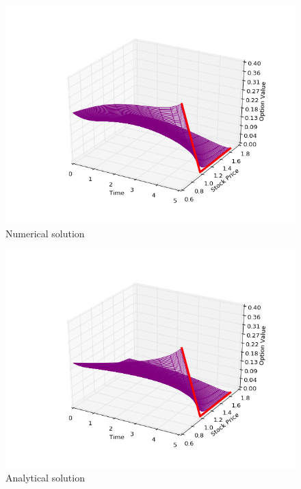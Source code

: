 \documentclass[11pt,a4paper]{extarticle}
\begin{document}
		\begin{minipage}{\linewidth}
      \centering
      \begin{minipage}{0.3\linewidth}
          \begin{figure}[H]
              \includegraphics[width=\linewidth]{Figures/eu-put-num}
              \caption{Numerical solution}
          \end{figure}
      \end{minipage}
      \hspace{0.05\linewidth}
      \begin{minipage}{0.3\linewidth}
          \begin{figure}[H]
              \includegraphics[width=\linewidth]{Figures/eu-put-analyt}
              \caption{Analytical solution}
          \end{figure}
      \end{minipage}
  \end{minipage}
\end{document}
